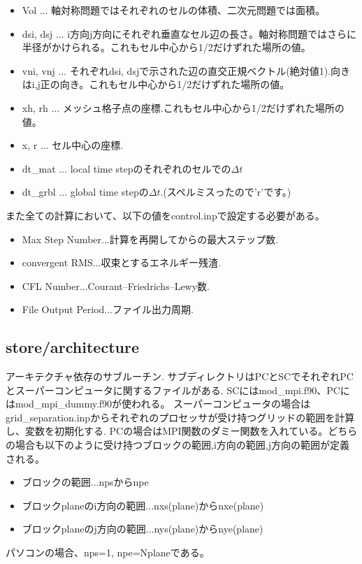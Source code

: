 \documentclass{jsarticle}
\begin{document}
\begin{itemize}
\begin{itemize}
\item Vol ... 軸対称問題ではそれぞれのセルの体積、二次元問題では面積。
\item dsi, dsj ... i方向j方向にそれぞれ垂直なセル辺の長さ。軸対称問題ではさらに半径がかけられる。これもセル中心から1/2だけずれた場所の値。
\item vni, vnj ... それぞれdsi, dsjで示された辺の直交正規ベクトル(絶対値1).向きはi,j正の向き。これもセル中心から1/2だけずれた場所の値。
\item xh, rh ... メッシュ格子点の座標.これもセル中心から1/2だけずれた場所の値。
\item x, r ... セル中心の座標.
\item dt\_mat ... local time stepのそれぞれのセルでの$\Delta t$
\item dt\_grbl ... global time stepの$\Delta t$.(スペルミスったので'r'です。)
\end{itemize}
\end{itemize}
また全ての計算において、以下の値をcontrol.inpで設定する必要がある。
\begin{itemize}
\item Max Step Number...計算を再開してからの最大ステップ数.
\item convergent RMS...収束とするエネルギー残渣.
\item CFL Number...Courant–Friedrichs–Lewy数.
\item File Output Period...ファイル出力周期.
\end{itemize}
\subsection{store/architecture}%
アーキテクチャ依存のサブルーチン.
サブディレクトリはPCとSCでそれぞれPCとスーパーコンピュータに関するファイルがある.
SCにはmod\_mpi.f90、PCにはmod\_mpi\_dummy.f90が使われる。
スーパーコンピュータの場合はgrid\_separation.inpからそれぞれのプロセッサが受け持つグリッドの範囲を計算し、変数を初期化する.
PCの場合はMPI関数のダミー関数を入れている。どちらの場合も以下のように受け持つブロックの範囲,i方向の範囲,j方向の範囲が定義される。
\begin{itemize}
\item ブロックの範囲...npsからnpe
\item ブロックplaneのi方向の範囲...nxs(plane)からnxe(plane)
\item ブロックplaneのj方向の範囲...nys(plane)からnye(plane)
\end{itemize}
パソコンの場合、nps=1, npe=Nplaneである。
\end{document}
